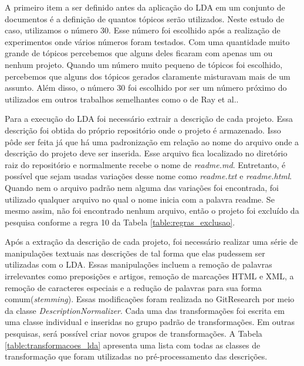A primeiro item a ser definido antes da aplicação do LDA em um conjunto de documentos é a definição de quantos tópicos serão utilizados. Neste estudo de caso, utilizamos o número 30. Esse número foi escolhido após a realização de experimentos onde vários números foram testados. Com uma quantidade muito grande de tópicos percebemos que alguns deles ficaram com apenas um ou nenhum projeto. Quando um número muito pequeno de tópicos foi escolhido, percebemos que alguns dos tópicos gerados claramente misturavam mais de um assunto. Além disso, o número 30 foi escolhido por ser um número próximo do utilizados em outros trabalhos semelhantes como o de Ray et al.\cite{ray2014large}. 

Para a execução do LDA foi necessário extrair a descrição de cada projeto. Essa descrição foi obtida do próprio repositório onde o projeto é armazenado. Isso pôde ser feita já que há uma padronização em relação ao nome do arquivo onde a descrição do projeto deve ser inserida. Esse arquivo fica localizado no diretório raiz do repositório e normalmente recebe o nome de \textit{readme.md}. Entretanto, é possível que sejam usadas variações desse nome como \textit{readme.txt} e \textit{readme.html}. Quando nem  o arquivo padrão nem  alguma das variações foi encontrada, foi utilizado qualquer arquivo no qual o nome inicia com a palavra readme. Se mesmo assim, não foi encontrado nenhum arquivo, então o projeto foi excluído da pesquisa conforme a regra 10 da Tabela \ref{table:regras_exclusao}.

Após a extração da descrição de cada projeto, foi necessário realizar uma série de manipulações textuais nas descrições de tal  forma que  elas pudessem ser utilizadas com o LDA. Essas manipulações incluem a remoção de palavras irrelevantes como preposições e artigos, remoção de marcações HTML e XML, a remoção de caracteres especiais e a redução de palavras para sua forma comum(\textit{stemming}\cite{jivani2011comparative}).  Essas modificações foram realizada no GitResearch por meio da classe \textit{DescriptionNormalizer}. Cada uma das transformações foi escrita em uma classe individual e inseridas no grupo padrão de transformações. Em outras pesquisas, será possível criar novos grupos de transformações.  A Tabela \ref{table:transformacoes_lda} apresenta uma lista com todas as classes de transformação que foram utilizadas no pré-processamento das descrições.



